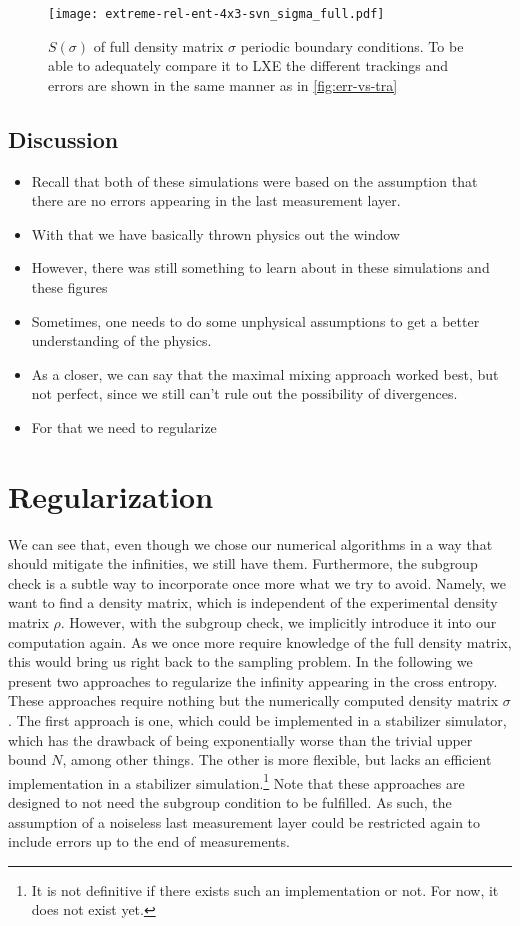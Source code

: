 \begin{figure}[p]
  \centering
  \texttt{[image: extreme-rel-ent-4x3-svn\_sigma\_full.pdf]}
  \caption{$S(\sigma)$ of full density matrix $\sigma$ 
  periodic boundary conditions. To be able to adequately compare it to LXE the
different trackings and errors are shown in the same manner as in
\cref{fig:err-vs-tra}}
  \label{fig:max_mix-svn_sigma_full-4x3}
\end{figure}

\subsection{Discussion}

\begin{itemize}
  \item Recall that both of these simulations were based on the assumption that
    there are no errors appearing in the last measurement layer.
  \item With that we have basically thrown physics out the window
  \item However, there was still something to learn about in these simulations
    and these figures
  \item Sometimes, one needs to do some unphysical assumptions to get a better
    understanding of the physics.
  \item As a closer, we can say that the maximal mixing approach worked best,
    but not perfect, since we still can't rule out the possibility of
    divergences.
  \item For that we need to regularize
\end{itemize}
\section{Regularization}

We can see that, even though we chose our numerical algorithms in a way that
should mitigate the infinities, we still have them. Furthermore, the subgroup
check is a subtle way to incorporate once more what we try to avoid. Namely, we
want to find a density matrix, which is independent of the experimental density
matrix $\rho$. However, with the subgroup check, we implicitly introduce it
into our computation again. As we once more require knowledge of the full
density matrix, this would bring us right back to the sampling problem. In the
following we present two approaches to regularize the infinity appearing in the
cross entropy. These approaches require nothing but the numerically computed
density matrix $\sigma$. The first approach is one, which could be implemented
in a stabilizer simulator, which has the drawback of being exponentially worse
than the trivial upper bound $N$, among other things. The other is more
flexible, but lacks an efficient implementation in a stabilizer
simulation.\footnote{It is not definitive if there exists such an
implementation or not. For now, it does not exist yet.}
Note that these approaches are
designed to not need the subgroup condition to be fulfilled. As such, the
assumption of a noiseless last measurement layer could be restricted again to
include errors up to the end of measurements. 

